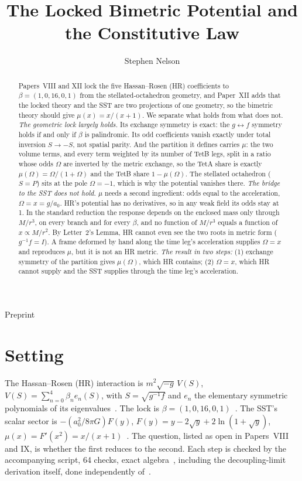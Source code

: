\documentclass[twocolumn]{iopjournal}
\renewcommand{\articletype}[1]{%
  {\vspace*{-8mm}\noindent \Large \sf Preprint}\par
  \vspace*{6mm}\noindent{\scriptsize \sf{\bfseries \MakeUppercase{#1}}}}
\begin{document}
\articletype{Supplementary Material}
\title{The Locked Bimetric Potential and the Constitutive Law}
\author{Stephen Nelson}

\begin{abstract}
Papers~VIII and XII lock the five Hassan--Rosen (HR) coefficients to
$\beta = (1,0,16,0,1)$ from the stellated-octahedron geometry, and
Paper~XII adds that the locked theory and the SST are two projections
of one geometry, so the bimetric theory should give
$\mu(x) = x/(x+1)$. We separate what holds from what does not.
\emph{The geometric lock largely holds.} Its exchange symmetry is
exact: the $g\leftrightarrow f$ symmetry holds if and only if $\beta$ is
palindromic. Its odd coefficients vanish exactly under total inversion
$S\to-S$, not spatial parity. And the partition it defines carries
$\mu$: the two volume terms, and every term weighted by its number of
TetB legs, split in a ratio whose odds $\Omega$ are inverted by the
metric exchange, so the TetA share is exactly $\mu(\Omega) =
\Omega/(1+\Omega)$ and the TetB share $1-\mu(\Omega)$. The stellated octahedron ($S = P$) sits at the pole
$\Omega = -1$, which is why the potential vanishes there.
\emph{The bridge to the SST does not hold.} $\mu$ needs a second
ingredient: odds equal to the acceleration, $\Omega = x = g/a_0$. HR's
potential has no derivatives, so in any weak field its odds stay at 1.
In the standard reduction the response depends on the enclosed mass
only through $M/r^3$, on every branch and for every $\beta$, and no
function of $M/r^3$ equals a function of $x\propto M/r^2$. By Letter~2's
Lemma, HR cannot even see the two roots in metric form ($g^{-1}f = I$).
A frame deformed by hand along the time leg's acceleration supplies
$\Omega = x$ and reproduces $\mu$, but it is not an HR metric.
\emph{The result in two steps:} (1) exchange symmetry of the partition
gives $\mu(\Omega)$, which HR contains; (2) $\Omega = x$, which HR
cannot supply and the SST supplies through the time leg's acceleration.
\end{abstract}


\section*{Setting}

The Hassan--Rosen (HR) interaction is
$m^2\sqrt{-g}\,V(S)$, $V(S) = \sum_{n=0}^4\beta_n e_n(S)$, with
$S = \sqrt{g^{-1}f}$ and $e_n$ the elementary symmetric polynomials of
its eigenvalues~\cite{HR2012}. The lock is
$\beta = (1,0,16,0,1)$~\cite{NelsonVIII,NelsonXII}. The SST's scalar
sector is $-(a_0^2/8\pi G)F(y)$, $F(y) = y - 2\sqrt y + 2\ln(1+\sqrt y)$,
$\mu(x) = F'(x^2) = x/(x+1)$~\cite{NelsonL3,NelsonPqs}. The question,
listed as open in Papers~VIII and IX, is whether the first reduces to
the second. Each step is checked by the accompanying script, 64 checks,
exact algebra~\cite{NelsonScript}, including the decoupling-limit
derivation itself, done independently of~\cite{NelsonBimetric}.
\end{document}

